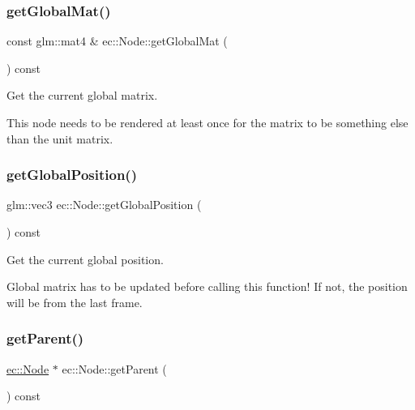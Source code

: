 \mbox{\label{classec_1_1_node_aecf550ed169a643bd9c23979377d8afc}} 
\subsubsection{\texorpdfstring{get\+Global\+Mat()}{getGlobalMat()}}
{\footnotesize\ttfamily const glm\+::mat4 \& ec\+::\+Node\+::get\+Global\+Mat (\begin{DoxyParamCaption}{ }\end{DoxyParamCaption}) const}



Get the current global matrix. 

This node needs to be rendered at least once for the matrix to be something else than the unit matrix. \mbox{\label{classec_1_1_node_ab4072f05f2b51e3d76f67e8557fc2134}} 
\subsubsection{\texorpdfstring{get\+Global\+Position()}{getGlobalPosition()}}
{\footnotesize\ttfamily glm\+::vec3 ec\+::\+Node\+::get\+Global\+Position (\begin{DoxyParamCaption}{ }\end{DoxyParamCaption}) const}



Get the current global position. 

Global matrix has to be updated before calling this function! If not, the position will be from the last frame. \mbox{\label{classec_1_1_node_ae1f93035b3df9db7a24afc06a7526dab}} 
\subsubsection{\texorpdfstring{get\+Parent()}{getParent()}}
{\footnotesize\ttfamily \mbox{\hyperlink{classec_1_1_node}{ec\+::\+Node}} $\ast$ ec\+::\+Node\+::get\+Parent (\begin{DoxyParamCaption}{ }\end{DoxyParamCaption}) const}



